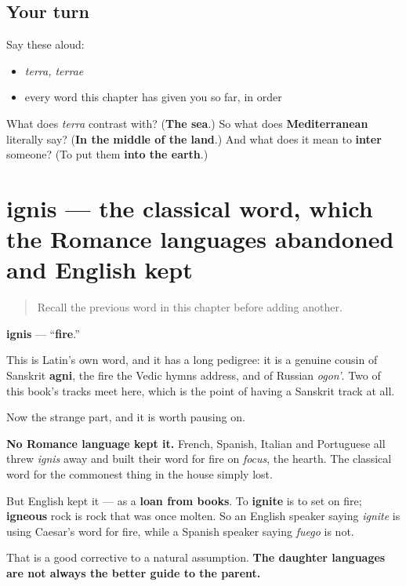\subsection*{Your turn}
Say these aloud:

\begin{itemize}
\raggedright
  \item \emph{terra, terrae}
  \item every word this chapter has given you so far, in order
\end{itemize}

\begin{tcolorbox}[breakable,colback=teal!4,colframe=teal!35!black,title={Before you move on}]
What does \emph{terra} contrast with? (\textbf{The sea}.) So what does \textbf{Mediterranean} literally say? (\textbf{In the middle of the land}.) And what does it mean to \textbf{inter} someone? (To put them \textbf{into the earth}.)
\end{tcolorbox}
\section[ignis, ignis]{ignis — the classical word, which the Romance languages abandoned and English kept}

\label{lesson:LA-C45-ignis}



\begin{quote}
Recall the previous word in this chapter before adding another.
\end{quote}

\begin{cousinweb}
\textbf{ignis} — \textquotedblleft{}\textbf{fire}.\textquotedblright{}

This is Latin's own word, and it has a long pedigree: it is a genuine cousin of Sanskrit \textbf{agni}, the fire the Vedic hymns address, and of Russian \emph{ogon'}. Two of this book's tracks meet here, which is the point of having a Sanskrit track at all.

Now the strange part, and it is worth pausing on.

\textbf{No Romance language kept it.} French, Spanish, Italian and Portuguese all threw \emph{ignis} away and built their word for fire on \emph{focus}, the hearth. The classical word for the commonest thing in the house simply lost.

But English kept it — as a \textbf{loan from books}. To \textbf{ignite} is to set on fire; \textbf{igneous} rock is rock that was once molten. So an English speaker saying \emph{ignite} is using Caesar's word for fire, while a Spanish speaker saying \emph{fuego} is not.

That is a good corrective to a natural assumption. \textbf{The daughter languages are not always the better guide to the parent.}
\end{cousinweb}

